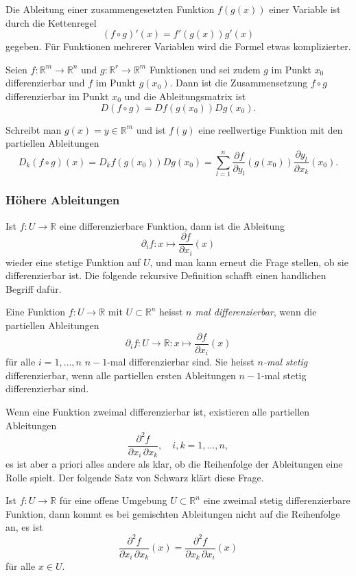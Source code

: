Die Ableitung einer zusammengesetzten Funktion $f(g(x))$ einer 
Variable ist durch die Kettenregel
\[
(f\circ g)'(x)
=
f'(g(x)) g'(x)
\]
gegeben.
Für Funktionen mehrerer Variablen wird die Formel etwas komplizierter.

\begin{satz}
Seien $f\colon \mathbb{R}^m\to\mathbb{R}^n$ und
$g\colon\mathbb{R}^r\to\mathbb{R}^m$ Funktionen und sei zudem
$g$ im Punkt $x_0$ differenzierbar und $f$ im Punkt $g(x_0)$.
Dann ist die Zusammensetzung $f\circ g$ differenzierbar im Punkt $x_0$
und die Ableitungsmatrix ist
\[
D(f\circ g) = Df(g(x_0)) Dg(x_0).
\]
\end{satz}

Schreibt man $g(x)=y\in\mathbb{R}^m$ und ist $f(y)$ eine reellwertige Funktion
mit den partiellen Ableitungen
\[
D_k(f\circ g)(x)
=
D_kf(g(x_0)) Dg(x_0)
=
\sum_{l=1}^n
\frac{\partial f}{\partial y_l}(g(x_0))
\frac{\partial y_l}{\partial x_k}(x_0).
\]

%
%
\subsubsection{Höhere Ableitungen}
Ist $f\colon U\to\mathbb{R}$ eine differenzierbare Funktion, dann ist
die Ableitung
\[
\partial_if\colon x\mapsto \frac{\partial f}{\partial x_i}(x)
\]
wieder eine stetige Funktion auf $U$, und man kann erneut die Frage
stellen, ob sie differenzierbar ist.
Die folgende rekursive Definition schafft einen handlichen Begriff
dafür.

\begin{definition}
Eine Funktion $f\colon U\to\mathbb{R}$ mit $U\subset\mathbb{R}^n$ heisst
{\em $n$ mal differenzierbar}, wenn die partiellen Ableitungen
\[
\partial_i f
\colon
U\to\mathbb{R}
:
x\mapsto
\frac{\partial f}{\partial x_i}(x)
\]
für alle $i=1,\dots,n$ $n-1$-mal differenzierbar sind.
Sie heisst {\em $n$-mal stetig} differenzierbar, wenn alle partiellen
ersten Ableitungen $n-1$-mal stetig differenzierbar sind.
\end{definition}

Wenn eine Funktion zweimal differenzierbar ist, existieren alle
partiellen Ableitungen
\[
\frac{\partial^2 f}{\partial x_i\,\partial x_k},
\quad
i,k=1,\dots,n,
\]
es ist aber a priori alles andere als klar, ob die Reihenfolge der
Ableitungen eine Rolle spielt.
Der folgende Satz von Schwarz klärt diese Frage.

\begin{satz}[Schwarz]
Ist $f\colon U\to\mathbb{R}$ für eine offene Umgebung $U\subset\mathbb{R}^n$
eine zweimal stetig differenzierbare Funktion, dann kommt es bei
gemischten Ableitungen nicht auf die Reihenfolge an, es ist
\[
\frac{\partial^2 f}{\partial x_i\,\partial x_k}(x)
=
\frac{\partial^2 f}{\partial x_k\,\partial x_i}(x)
\]
für alle $x\in U$.
\end{satz}

